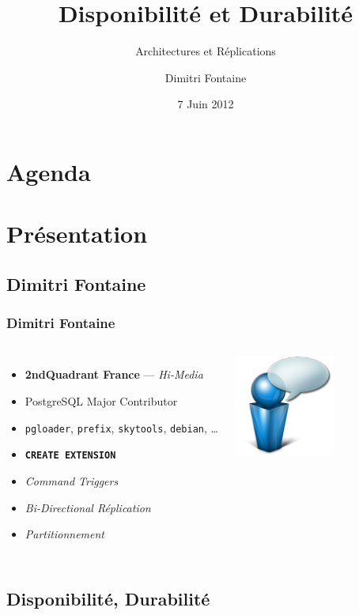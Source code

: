 \documentclass[english]{beamer}
\title{Disponibilité et Durabilité}
\subtitle{Architectures et Réplications}
\author{Dimitri Fontaine}
\date{7 Juin 2012}
\begin{document}
\frame{\titlepage}

\section*{Agenda}

\section{Présentation}

\subsection{Dimitri Fontaine}

\begin{frame}[fragile]
  \frametitle{Dimitri Fontaine}

\begin{columns}[c]

  \begin{itemize}
   \item<1-> \alert{\textbf{2ndQuadrant France}} — \textit{Hi-Media}
   \item<2-> \alert{PostgreSQL Major Contributor}
   \item<2-> \texttt{pgloader}, \texttt{prefix}, \texttt{skytools}, \texttt{debian}, …
   \item<3-> \texttt{\textbf{CREATE EXTENSION}}
   \item<4-> \textit{Command Triggers}
   \item<4-> \textit{Bi-Directional Réplication}
   \item<4-> \textit{Partitionnement}
  \end{itemize}  

\begin{center}
  \includegraphics[height=9em]{bulle-blue-icon.png}
\end{center}
\end{columns}
\end{frame}

\subsection{Disponibilité, Durabilité}
\end{document}
